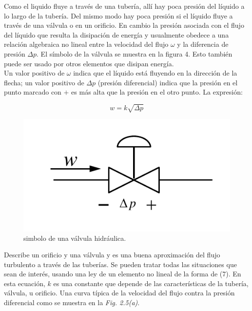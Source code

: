\documentclass[a4paper,12pt,twoside]{proyectotanquesecci}
\begin{document}
Como el liquido fluye a través de una tubería, allí hay poca presión del líquido a lo largo de la tubería. Del mismo modo hay poca presión si el líquido fluye a través de una válvula o en un orificio. En cambio la presión asociada con el flujo del líquido que resulta la disipación de energía y usualmente obedece a una relación algebraica no lineal entre la velocidad del flujo $\omega$ y la diferencia de presión $\Delta p$. El símbolo de la válvula se muestra en la figura 4. Esto también puede ser usado por otros elementos que disipan energía. \\

Un valor positivo de $\omega$ indica que el líquido está fluyendo en la dirección de la flecha; un valor positivo de $\Delta p$ (presión diferencial) indica que la presión en el punto marcado con $+$ es más alta que la presión en el otro punto. La expresión:

\begin{equation}
w=k\sqrt{\Delta p}
\label{Ecu 7}
\end{equation}

\begin{figure}[h]
\centering
\includegraphics[scale=0.5]{Figura4}
\renewcommand{\figurename}{Fig.}
\caption{simbolo de una válvula hidráulica.}
\label{simbolo de una válvula hidráulica.}
\end{figure}

Describe un orificio y una válvula y es una buena aproximación del flujo turbulento a través de las tuberías. Se pueden tratar todas las situaciones que sean de interés, usando una ley de un elemento no lineal de la forma de (7). En esta ecuación, $k$ es una constante que depende de las características de la tubería, válvula, u orificio. Una curva típica de la velocidad del flujo contra la presión diferencial como se muestra en la \textit{Fig. 2.5(a)}.
\end{document}
